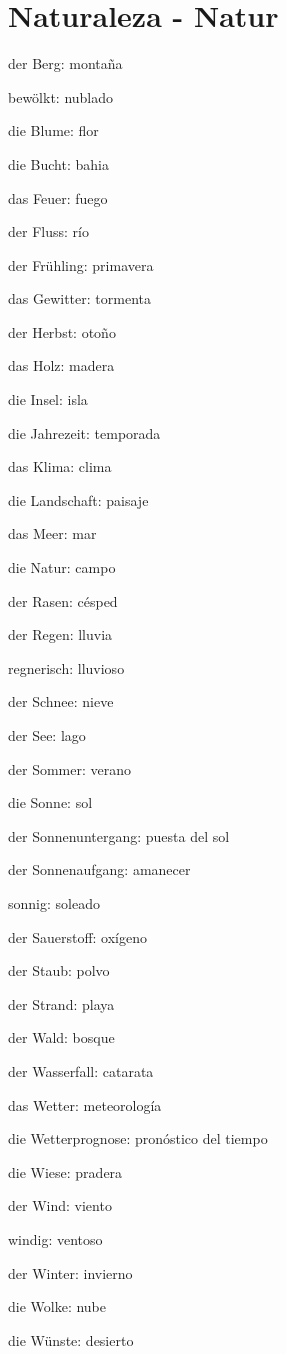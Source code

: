 \section{Naturaleza - Natur}
\begin{multicols}{2}
\begin{myitemize}
\item der Berg: montaña
\item bewölkt: nublado
\item die Blume: flor
\item die Bucht: bahia
\item das Feuer: fuego
\item der Fluss: río
\item der Frühling: primavera
\item das Gewitter: tormenta
\item der Herbst: otoño
\item das Holz: madera
\item die Insel: isla
\item die Jahrezeit: temporada
\item das Klima: clima
\item die Landschaft: paisaje
\item das Meer: mar
\item die Natur: campo
\item der Rasen: césped
\item der Regen: lluvia
\item regnerisch: lluvioso
\item der Schnee: nieve
\item der See: lago
\item der Sommer: verano
\item die Sonne: sol
\item der Sonnenuntergang: puesta del sol
\item der Sonnenaufgang: amanecer
\item sonnig: soleado
\item der Sauerstoff: oxígeno
\item der Staub: polvo
\item der Strand: playa
\item der Wald: bosque
\item der Wasserfall: catarata
\item das Wetter: meteorología
\item die Wetterprognose: pronóstico del tiempo
\item die Wiese: pradera
\item der Wind: viento
\item windig: ventoso
\item der Winter: invierno
\item die Wolke: nube
\item die Wünste: desierto
\end{myitemize}
\end{multicols}


